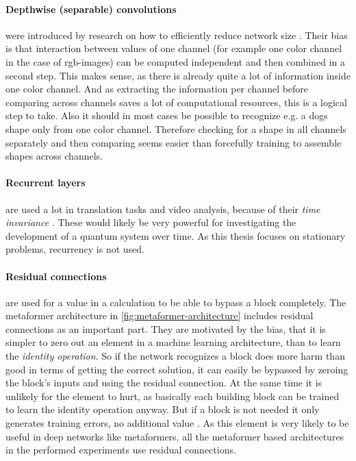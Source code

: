 \paragraph{Depthwise (separable) convolutions} were introduced by research on how to efficiently reduce network size \cite{mobileNetPaper}.
Their bias is that interaction between values of one channel (for example one color channel in the case of rgb-images) can be computed independent and then combined in a second step.
This makes sense, as there is already quite a lot of information inside one color channel. 
And as extracting the information per channel before comparing across channels saves a lot of computational resources, this is a logical step to take.
Also it should in most cases be possible to recognize e.g. a dogs shape only from one color channel. 
Therefore checking for a shape in all channels separately and then comparing seems easier than forcefully training to assemble shapes across channels.

\paragraph{Recurrent layers} are used a lot in translation tasks and video analysis, because of their \emph{time invariance} \cite{relationalInductiveBiasesAndGraphNetworks}. 
These would likely be very powerful for investigating the development of a quantum system over time. 
As this thesis focuses on stationary problems, recurrency is not used.

\paragraph{Residual connections} are used for a value in a calculation to be able to bypass a block completely.
The metaformer architecture in \autoref{fig:metaformer-architecture} includes residual connections as an important part.
They are motivated by the bias, that it is simpler to zero out an element in a machine learning architecture, than to learn the \emph{identity operation}. 
So if the network recognizes a block does more harm than good in terms of getting the correct solution, it can easily be bypassed by zeroing the block's inputs and using the residual connection. 
At the same time it is unlikely for the element to hurt, as basically each building block can be trained to learn the identity operation anyway. 
But if a block is not needed it only generates training errors, no additional value \cite{deepResidualLearningForImageRecognition}.
As this element is very likely to be useful in deep networks like metaformers, all the metaformer based architectures in the performed experiments use residual connections.

